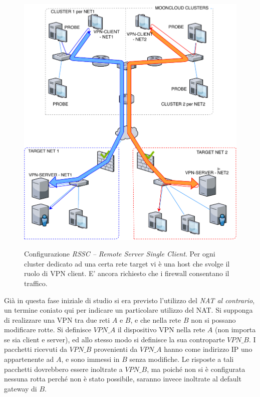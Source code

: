 \begin{figure}[h!]
	\includegraphics[scale=0.55]{img/rssc}
	\label{fig:rssc}
	\caption[Configurazione \textit{RSSC -- Remote Server Single Client}]{Configurazione
		\textit{RSSC -- Remote Server Single Client}. Per ogni cluster dedicato ad una certa rete target
		vi è una host che svolge il ruolo di VPN client. E' ancora richiesto che i firewall
	consentano il traffico.}
\end{figure}

Già in questa fase iniziale di studio si era previsto l'utilizzo del \textit{NAT al contrario},
un termine coniato qui per indicare un particolare utilizzo del NAT. 
Si supponga di realizzare una VPN tra due reti $A$ e $B$, e che
nella rete $B$ non si possano modificare rotte. Si definisce $VPN\_A$ il dispositivo
VPN nella rete $A$ (non
importa se sia client e server), ed allo stesso modo si definisce la sua controparte $VPN\_B$.
I pacchetti ricevuti da $VPN\_B$ provenienti da $VPN\_A$ hanno come indirizzo IP uno appartenente
ad $A$, e sono immessi in $B$ senza modifiche. Le risposte a tali pacchetti dovrebbero essere inoltrate
a $VPN\_B$, ma poiché non si è configurata nessuna rotta perché non è stato possibile, saranno invece
inoltrate al default gateway di $B$.


